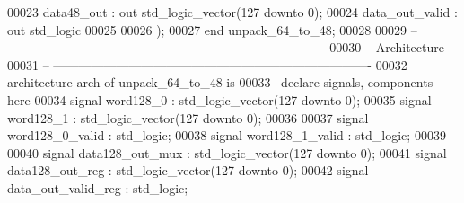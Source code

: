 \begin{DoxyCode}
00023         \textcolor{vhdlchar}{data48_out}      \textcolor{vhdlchar}{:} \textcolor{keywordflow}{out} \textcolor{comment}{std\_logic\_vector}\textcolor{vhdlchar}{(}\textcolor{vhdllogic}{}\textcolor{vhdllogic}{127} \textcolor{keywordflow}{downto} \textcolor{vhdllogic}{}\textcolor{vhdllogic}{0}\textcolor{vhdlchar}{)};
00024         \textcolor{vhdlchar}{data_out_valid}  \textcolor{vhdlchar}{:} \textcolor{keywordflow}{out} \textcolor{comment}{std\_logic}
00025        
00026         \textcolor{vhdlchar}{)};
00027 \textcolor{keywordflow}{end} \textcolor{vhdlchar}{unpack\_64\_to\_48};
00028 
00029 \textcolor{keyword}{-- ----------------------------------------------------------------------------}
00030 \textcolor{keyword}{-- Architecture}
00031 \textcolor{keyword}{-- ----------------------------------------------------------------------------}
00032 \textcolor{keywordflow}{architecture} arch \textcolor{keywordflow}{of} unpack_64_to_48 is
00033 \textcolor{keyword}{--declare signals,  components here}
00034 \textcolor{keywordflow}{signal} \textcolor{vhdlchar}{word128_0}              \textcolor{vhdlchar}{:} \textcolor{comment}{std\_logic\_vector}\textcolor{vhdlchar}{(}\textcolor{vhdllogic}{}\textcolor{vhdllogic}{127} \textcolor{keywordflow}{downto} \textcolor{vhdllogic}{}\textcolor{vhdllogic}{0}\textcolor{vhdlchar}{)};
00035 \textcolor{keywordflow}{signal} \textcolor{vhdlchar}{word128_1}              \textcolor{vhdlchar}{:} \textcolor{comment}{std\_logic\_vector}\textcolor{vhdlchar}{(}\textcolor{vhdllogic}{}\textcolor{vhdllogic}{127} \textcolor{keywordflow}{downto} \textcolor{vhdllogic}{}\textcolor{vhdllogic}{0}\textcolor{vhdlchar}{)};
00036 
00037 \textcolor{keywordflow}{signal} \textcolor{vhdlchar}{word128_0_valid}     \textcolor{vhdlchar}{:} \textcolor{comment}{std\_logic};
00038 \textcolor{keywordflow}{signal} \textcolor{vhdlchar}{word128_1_valid}     \textcolor{vhdlchar}{:} \textcolor{comment}{std\_logic};
00039 
00040 \textcolor{keywordflow}{signal} \textcolor{vhdlchar}{data128_out_mux}     \textcolor{vhdlchar}{:} \textcolor{comment}{std\_logic\_vector}\textcolor{vhdlchar}{(}\textcolor{vhdllogic}{}\textcolor{vhdllogic}{127} \textcolor{keywordflow}{downto} \textcolor{vhdllogic}{}\textcolor{vhdllogic}{0}\textcolor{vhdlchar}{)};
00041 \textcolor{keywordflow}{signal} \textcolor{vhdlchar}{data128_out_reg}     \textcolor{vhdlchar}{:} \textcolor{comment}{std\_logic\_vector}\textcolor{vhdlchar}{(}\textcolor{vhdllogic}{}\textcolor{vhdllogic}{127} \textcolor{keywordflow}{downto} \textcolor{vhdllogic}{}\textcolor{vhdllogic}{0}\textcolor{vhdlchar}{)};
00042 \textcolor{keywordflow}{signal} \textcolor{vhdlchar}{data_out_valid_reg}  \textcolor{vhdlchar}{:} \textcolor{comment}{std\_logic};

\end{DoxyCode}
